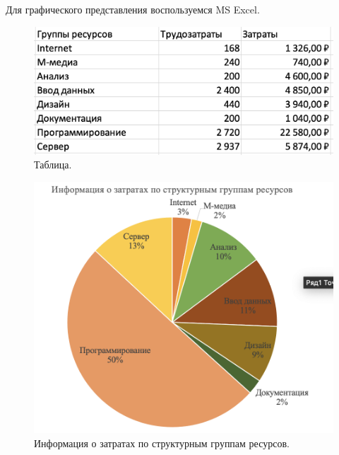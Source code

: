 \documentclass[a4paper,14pt]{extreport} %
\begin{document}
\begin{enumerate}
Для графического представления воспользуемся MS Excel.

\begin{figure}[H]
  \centering
  \caption{Таблица. }
  \includegraphics[scale=0.5]{table}
\end{figure}

\begin{figure}[H]
  \centering
  \caption{Информация о затратах по структурным группам ресурсов. }
  \includegraphics[scale=0.75]{d1}
\end{figure}


\end{enumerate}
\end{document}
